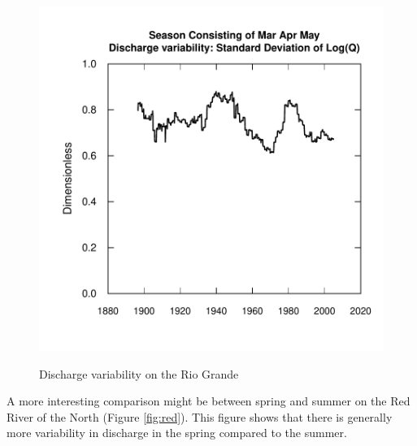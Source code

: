 \documentclass[a4paper,11pt]{article}
\begin{document}
\begin{figure}[htbp]
\begin{minipage}[h]{0.5\linewidth}
\begin{center}
\includegraphics{EGRET-fig2b}
    \label{fig:SD2}
    \end{center}
  \end{minipage}
  \caption{Discharge variability on the Rio Grande}
\end{figure}

A more interesting comparison might be between spring and summer on the Red River of the North (Figure \ref{fig:red}).  This figure shows that there is generally more variability in discharge in the spring compared to the summer.
\end{document}
